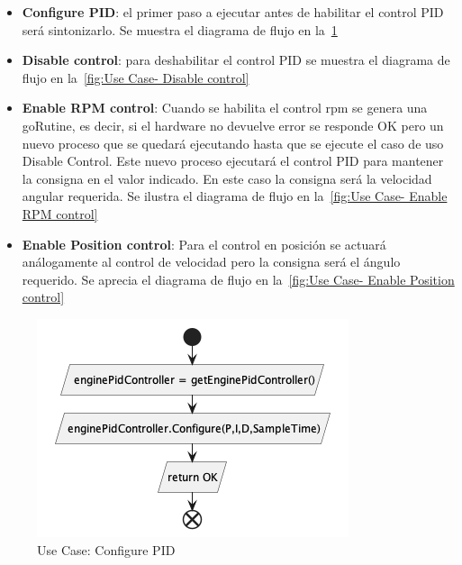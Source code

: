 \begin{itemize}
    \item \textbf{Configure PID}: el primer paso a ejecutar antes de habilitar el control PID será sintonizarlo.
    Se muestra el diagrama de flujo en la~\cref{fig:Use Case-Configure PID}

    \item \textbf{Disable control}: para deshabilitar el control PID se muestra el diagrama de flujo en la~\cref{fig:Use Case- Disable control}

    \item \textbf{Enable RPM control}: Cuando se habilita el control rpm se genera una goRutine, es decir, si el hardware no devuelve error se responde OK pero un nuevo proceso que se quedará ejecutando hasta que se ejecute el caso de uso Disable Control.
    Este nuevo proceso ejecutará el control PID para mantener la consigna en el valor indicado.
    En este caso la consigna será la velocidad angular requerida.
    Se ilustra el diagrama de flujo en la~\cref{fig:Use Case- Enable RPM control}

    \item \textbf{Enable Position control}: Para el control en posición se actuará análogamente al control de velocidad pero la consigna será el ángulo requerido.
    Se aprecia el diagrama de flujo en la~\cref{fig:Use Case- Enable Position control}
\end{itemize}

\begin{figure}[H]
    \centering
    \includegraphics[height=0.2\textheight]{./part/Proyecto_ejecutivo/memoria_descriptiva/descripcionDelProyecto/control/uml/configurePID}
    \caption{Use Case: Configure PID}\label{fig:Use Case-Configure PID}
\end{figure}

